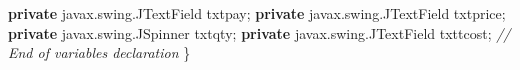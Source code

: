 \documentclass[
  10pt,
]{article}
\newenvironment{Shaded}{}{}
\newcommand{\CommentTok}[1]{\textcolor[rgb]{0.38,0.63,0.69}{\textit{#1}}}
\newcommand{\FunctionTok}[1]{\textcolor[rgb]{0.02,0.16,0.49}{#1}}
\newcommand{\KeywordTok}[1]{\textcolor[rgb]{0.00,0.44,0.13}{\textbf{#1}}}
\newcommand{\NormalTok}[1]{#1}
\newcommand{\OperatorTok}[1]{\textcolor[rgb]{0.40,0.40,0.40}{#1}}
\begin{document}
\begin{Shaded}
\begin{Highlighting}[numbers=left,,]
    \KeywordTok{private}\NormalTok{ javax}\OperatorTok{.}\FunctionTok{swing}\OperatorTok{.}\FunctionTok{JTextField}\NormalTok{ txtpay}\OperatorTok{;}
    \KeywordTok{private}\NormalTok{ javax}\OperatorTok{.}\FunctionTok{swing}\OperatorTok{.}\FunctionTok{JTextField}\NormalTok{ txtprice}\OperatorTok{;}
    \KeywordTok{private}\NormalTok{ javax}\OperatorTok{.}\FunctionTok{swing}\OperatorTok{.}\FunctionTok{JSpinner}\NormalTok{ txtqty}\OperatorTok{;}
    \KeywordTok{private}\NormalTok{ javax}\OperatorTok{.}\FunctionTok{swing}\OperatorTok{.}\FunctionTok{JTextField}\NormalTok{ txttcost}\OperatorTok{;}
    \CommentTok{// End of variables declaration                   }
\OperatorTok{\}}
\end{Highlighting}
\end{Shaded}
\end{document}
